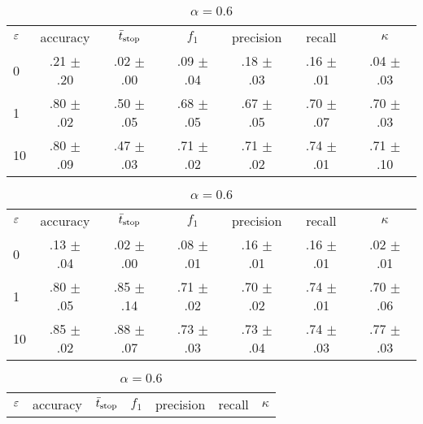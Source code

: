 \begin{frame}
\begin{table}
\begin{subtable}{.5\textwidth}
		\scriptsize
		\hspace{-1em}\begin{tabular}{lcccccc}
			\toprule
			\textbf{$\varepsilon$} & accuracy & $\bar{t}_\text{stop}$  & $f_1$ & precision & recall & $\kappa$ \\
			\cmidrule(lr){0-0}\cmidrule(lr){1-1}\cmidrule(lr){2-2}\cmidrule(lr){3-3}\cmidrule(lr){4-4}\cmidrule(lr){5-5}\cmidrule(lr){6-6}\cmidrule(lr){7-7}
			0 & .21 $\pm$ .20 & .02 $\pm$ .00 & .09 $\pm$ .04 & .18 $\pm$ .03 & .16 $\pm$ .01 & .04 $\pm$ .03 \\
			1 & .80 $\pm$ .02 & .50 $\pm$ .05 & .68 $\pm$ .05 & .67 $\pm$ .05 & .70 $\pm$ .07 & .70 $\pm$ .03 \\
			10 & .80 $\pm$ .09 & .47 $\pm$ .03 & .71 $\pm$ .02 & .71 $\pm$ .02 & .74 $\pm$ .01 & .71 $\pm$ .10 \\
			\bottomrule
		\end{tabular}
		\caption{\emph{$\alpha=0.4$}}
		\label{tab:epsilon:a04}
	\end{subtable}
	\begin{subtable}{.5\textwidth}
		\scriptsize
		\hspace{-1em}\begin{tabular}{lcccccc}
			\toprule
			\textbf{$\varepsilon$} & accuracy & $\bar{t}_\text{stop}$  & $f_1$ & precision & recall & $\kappa$ \\
			\cmidrule(lr){0-0}\cmidrule(lr){1-1}\cmidrule(lr){2-2}\cmidrule(lr){3-3}\cmidrule(lr){4-4}\cmidrule(lr){5-5}\cmidrule(lr){6-6}\cmidrule(lr){7-7}
			0 & .13 $\pm$ .04 & .02 $\pm$ .00 & .08 $\pm$ .01 & .16 $\pm$ .01 & .16 $\pm$ .01 & .02 $\pm$ .01 \\
			1 & .80 $\pm$ .05 & .85 $\pm$ .14 & .71 $\pm$ .02 & .70 $\pm$ .02 & .74 $\pm$ .01 & .70 $\pm$ .06 \\
			10 & .85 $\pm$ .02 & .88 $\pm$ .07 & .73 $\pm$ .03 & .73 $\pm$ .04 & .74 $\pm$ .03 & .77 $\pm$ .03 \\
			\bottomrule
		\end{tabular}
		\caption{\emph{$\alpha=0.6$}}
		\label{tab:epsilon:a06}
	\end{subtable}
	\begin{subtable}{.5\textwidth}
		\scriptsize
		\hspace{-1em}\begin{tabular}{lcccccc}
			\toprule
			\textbf{$\varepsilon$} & accuracy & $\bar{t}_\text{stop}$  & $f_1$ & precision & recall & $\kappa$ \\
			\cmidrule(lr){0-0}\cmidrule(lr){1-1}\cmidrule(lr){2-2}\cmidrule(lr){3-3}\cmidrule(lr){4-4}\cmidrule(lr){5-5}\cmidrule(lr){6-6}\cmidrule(lr){7-7}

\end{tabular}
\end{subtable}
\end{table}
\end{frame}
